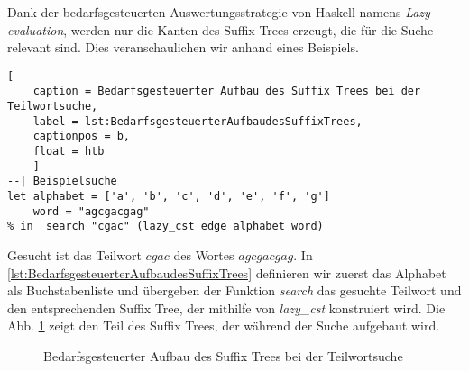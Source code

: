 \documentclass[12pt]{report}
\begin{document}
Dank der bedarfsgesteuerten Auswertungsstrategie von Haskell namens \textit{Lazy evaluation}, werden nur die Kanten des Suffix Trees erzeugt, die für die Suche relevant sind. Dies veranschaulichen wir anhand eines Beispiels.

\begin{lstlisting}[
    caption = Bedarfsgesteuerter Aufbau des Suffix Trees bei der Teilwortsuche,
    label = lst:BedarfsgesteuerterAufbaudesSuffixTrees,
    captionpos = b,
    float = htb
    ]
--| Beispielsuche
let alphabet = ['a', 'b', 'c', 'd', 'e', 'f', 'g']
    word = "agcgacgag"
% in  search "cgac" (lazy_cst edge alphabet word)
\end{lstlisting}


Gesucht ist das Teilwort $cgac$ des Wortes $agcgacgag$. In \ref{lst:BedarfsgesteuerterAufbaudesSuffixTrees} definieren wir zuerst das Alphabet als Buchstabenliste und übergeben der Funktion \textit{search} das gesuchte Teilwort und den entsprechenden Suffix Tree, der mithilfe von \textit{lazy\_cst} konstruiert wird. Die Abb. \ref{fig:BedarfsgesteuerterAufbaudesSuffixTrees} zeigt den Teil des Suffix Trees, der während der Suche aufgebaut wird.


\begin{figure}[htb]
\centering
{}
\caption{Bedarfsgesteuerter Aufbau des Suffix Trees bei der Teilwortsuche}
\label{fig:BedarfsgesteuerterAufbaudesSuffixTrees}
\end{figure}
\end{document}
